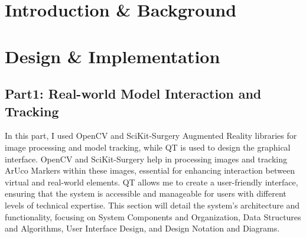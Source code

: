 \documentclass[12pt]{article}
\begin{document}
\section{Introduction \& Background}



\section{Design \& Implementation}

\subsection{Part1: Real-world Model Interaction and Tracking}

In this part, I used OpenCV\cite{opencv_library} and SciKit-Surgery Augmented Reality\cite{Thompson_SciKit-Surgery_Compact_Libraries_2020} libraries for image 
processing and  model tracking, while QT\cite{QtWebsite} is used to design the graphical interface. OpenCV and SciKit-Surgery help in processing images 
and tracking ArUco Markers\cite{1467495} within these images, essential for enhancing interaction between virtual and real-world elements. 
QT allows me to create a user-friendly interface, ensuring that the system is accessible and manageable for users with different levels of technical expertise. 
This section will detail the system's architecture and functionality, focusing on System Components and Organization, Data Structures and Algorithms, 
User Interface Design, and Design Notation and Diagrams.
\end{document}
